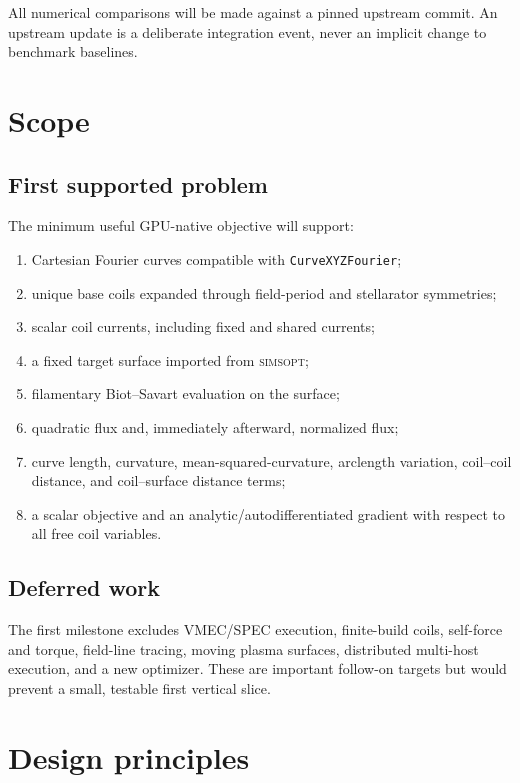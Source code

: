 \documentclass[11pt,a4paper]{article}
\newcommand{\simsopt}{\textsc{simsopt}}
\newcommand{\code}[1]{\texttt{#1}}
\begin{document}
All numerical comparisons will be made against a pinned upstream commit.  An
upstream update is a deliberate integration event, never an implicit change to
benchmark baselines.

\section{Scope}

\subsection{First supported problem}

The minimum useful GPU-native objective will support:
\begin{enumerate}
  \item Cartesian Fourier curves compatible with \code{CurveXYZFourier};
  \item unique base coils expanded through field-period and stellarator
        symmetries;
  \item scalar coil currents, including fixed and shared currents;
  \item a fixed target surface imported from \simsopt{};
  \item filamentary Biot--Savart evaluation on the surface;
  \item quadratic flux and, immediately afterward, normalized flux;
  \item curve length, curvature, mean-squared-curvature, arclength variation,
        coil--coil distance, and coil--surface distance terms;
  \item a scalar objective and an analytic/autodifferentiated gradient with
        respect to all free coil variables.
\end{enumerate}

\subsection{Deferred work}

The first milestone excludes VMEC/SPEC execution, finite-build coils,
self-force and torque, field-line tracing, moving plasma surfaces, distributed
multi-host execution, and a new optimizer.  These are important follow-on
targets but would prevent a small, testable first vertical slice.

\section{Design principles}
\end{document}
